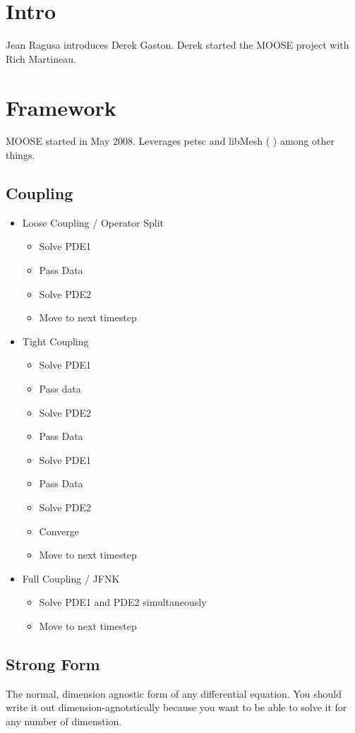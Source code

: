 \section{Intro}
Jean Ragusa introduces Derek Gaston. Derek started the MOOSE project with Rich 
Martineau. 



\section{Framework}

MOOSE started in May 2008. Leverages petsc and libMesh ( ) among other things. 


\subsection{Coupling}
\begin{itemize}
  \item Loose Coupling / Operator Split
    \begin{itemize}
      \item Solve PDE1
      \item Pass Data
      \item Solve PDE2
      \item Move to next timestep
    \end{itemize}
  \item Tight Coupling 
    \begin{itemize}
      \item Solve PDE1
      \item Pass data
      \item Solve PDE2
      \item Pass Data
      \item Solve PDE1
      \item Pass Data
      \item Solve PDE2
      \item Converge
      \item Move to next timestep
    \end{itemize}
  \item Full Coupling / JFNK
    \begin{itemize}
      \item Solve PDE1 and PDE2 simultaneously
      \item Move to next timestep
    \end{itemize}
\end{itemize}

\subsection{Strong Form}
The normal, dimension agnostic form of any differential equation. You should 
write it out dimension-agnotstically because you want to be able to solve it for any 
number of dimenstion.

